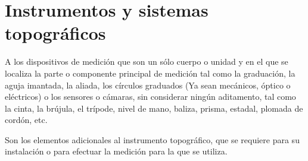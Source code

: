\section{Instrumentos y sistemas topográficos}

\begin{definition}
    A los dispositivos de medición que son un sólo cuerpo o unidad y en el que se localiza la parte o componente principal de medición tal como la graduación, la aguja imantada, la aliada, los círculos graduados (Ya sean mecánicos, óptico o eléctricos) o los sensores o cámaras, sin considerar ningún aditamento, tal como la cinta, la brújula, el trípode, nivel de mano, baliza, prisma, estadal, plomada de cordón, etc.
\end{definition}

\begin{definition}[Aditamentos]
    Son los elementos adicionales al instrumento topográfico, que se requiere para su instalación o para efectuar la medición para la que se utiliza.
\end{definition}

